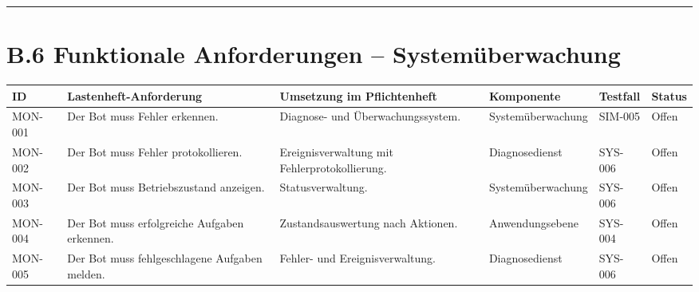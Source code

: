 \documentclass[
  a4paper,
  12pt,
  DIV=12,        %
  parskip=half,  %
  headings=small %
]{scrartcl}
\theoremstyle{definition}
\theoremstyle{definition}
\begin{document}
\begin{center}\rule{0.5\linewidth}{0.5pt}\end{center}

\section{B.6 Funktionale Anforderungen --
Systemüberwachung}\label{b.6-funktionale-anforderungen-systemuxfcberwachung}

\begin{longtable}[]{@{}
  >{\raggedright\arraybackslash}p{}
  >{\raggedright\arraybackslash}p{}
  >{\raggedright\arraybackslash}p{}
  >{\raggedright\arraybackslash}p{}
  >{\raggedright\arraybackslash}p{}
  >{\raggedright\arraybackslash}p{}@{}}
\toprule\noalign{}
\begin{minipage}[b]{\linewidth}\raggedright
ID
\end{minipage} & \begin{minipage}[b]{\linewidth}\raggedright
Lastenheft-Anforderung
\end{minipage} & \begin{minipage}[b]{\linewidth}\raggedright
Umsetzung im Pflichtenheft
\end{minipage} & \begin{minipage}[b]{\linewidth}\raggedright
Komponente
\end{minipage} & \begin{minipage}[b]{\linewidth}\raggedright
Testfall
\end{minipage} & \begin{minipage}[b]{\linewidth}\raggedright
Status
\end{minipage} \\
\midrule\noalign{}
\endhead
\bottomrule\noalign{}
\endlastfoot
MON-001 & Der Bot muss Fehler erkennen. & Diagnose- und
Überwachungssystem. & Systemüberwachung & SIM-005 & Offen \\
MON-002 & Der Bot muss Fehler protokollieren. & Ereignisverwaltung mit
Fehlerprotokollierung. & Diagnosedienst & SYS-006 & Offen \\
MON-003 & Der Bot muss Betriebszustand anzeigen. & Statusverwaltung. &
Systemüberwachung & SYS-006 & Offen \\
MON-004 & Der Bot muss erfolgreiche Aufgaben erkennen. &
Zustandsauswertung nach Aktionen. & Anwendungsebene & SYS-004 & Offen \\
MON-005 & Der Bot muss fehlgeschlagene Aufgaben melden. & Fehler- und
Ereignisverwaltung. & Diagnosedienst & SYS-006 & Offen \\
\end{longtable}
\end{document}
